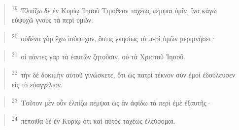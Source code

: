 \documentclass{article}
\newcommand{\currentverse}{1} %
\newcommand{\setcurrentverse}[1]{\renewcommand{\currentverse}{#1}}
\begin{document}
\begin{verse}

\setcurrentverse{19}

\setcounter{footnote}{0}

\textsuperscript{19}~Ἐλπίζω δὲ ἐν Κυρίῳ Ἰησοῦ Τιμόθεον ταχέως πέμψαι ὑμῖν, ἵνα κἀγὼ εὐψυχῶ γνοὺς τὰ περὶ ὑμῶν.

\end{verse}

\begin{verse}

\setcurrentverse{20}

\setcounter{footnote}{0}

\textsuperscript{20}~οὐδένα γὰρ ἔχω ἰσόψυχον, ὅστις γνησίως τὰ περὶ ὑμῶν μεριμνήσει·

\end{verse}

\begin{verse}

\setcurrentverse{21}

\setcounter{footnote}{0}

\textsuperscript{21}~οἱ πάντες γὰρ τὰ ἑαυτῶν ζητοῦσιν, οὐ τὰ Χριστοῦ Ἰησοῦ.

\end{verse}

\begin{verse}

\setcurrentverse{22}

\setcounter{footnote}{0}

\textsuperscript{22}~τὴν δὲ δοκιμὴν αὐτοῦ γινώσκετε, ὅτι ὡς πατρὶ τέκνον σὺν ἐμοὶ ἐδούλευσεν εἰς τὸ εὐαγγέλιον.

\end{verse}

\begin{verse}

\setcurrentverse{23}

\setcounter{footnote}{0}

\textsuperscript{23}~Τοῦτον μὲν οὖν ἐλπίζω πέμψαι ὡς ἂν ἀφίδω τὰ περὶ ἐμὲ ἐξαυτῆς·

\end{verse}

\begin{verse}

\setcurrentverse{24}

\setcounter{footnote}{0}

\textsuperscript{24}~πέποιθα δὲ ἐν Κυρίῳ ὅτι καὶ αὐτὸς ταχέως ἐλεύσομαι.

\end{verse}
\end{document}
